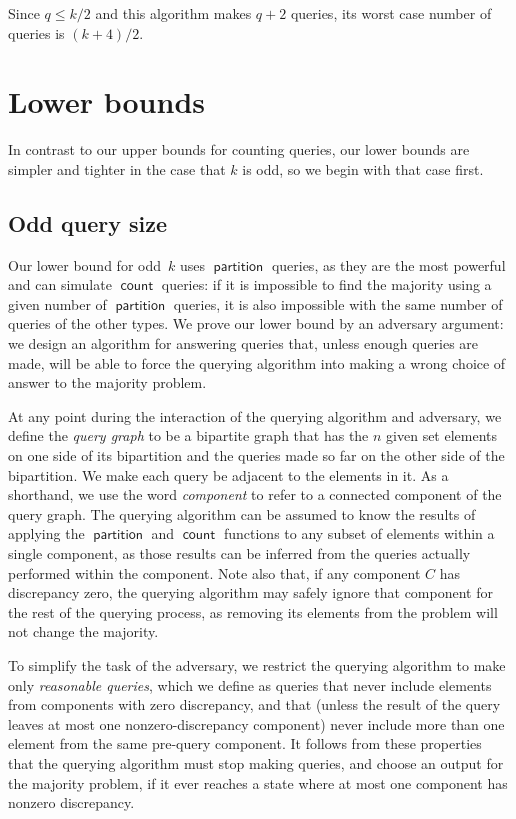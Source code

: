 \documentclass[11pt]{llncs}
\newcommand{\qcount}{\operatorname{\mathsf{count}}}
\newcommand{\qpart}{\operatorname{\mathsf{partition}}}
\begin{document}
Since $q\le k/2$ and this algorithm makes $q+2$ queries, its worst case number of queries
is $(k+4)/2$.
\fi

\section{Lower bounds}

In contrast to our upper bounds for counting queries, our lower bounds are simpler and tighter in the case that $k$ is odd, so we begin with that case first.

\ifFull
\subsection{Odd query size}
\fi

Our lower bound for odd~$k$ uses $\qpart$ queries, as they are the most powerful and can simulate  $\qcount$ queries: if it is impossible to find the majority using a given number of $\qpart$ queries, it is also impossible with the same number of queries of the other types. We prove our lower bound by an adversary argument: we design an algorithm for answering queries that, unless enough queries are made, will be able to force the querying algorithm into making a wrong choice of answer to the majority problem.

At any point during the interaction of the querying algorithm and adversary, we define the \emph{query graph} to be a bipartite graph that has the $n$ given set elements on one side of its bipartition and the queries made so far on the other side of the bipartition. We make each query be adjacent to the elements in it. As a shorthand, we use the word \emph{component} to refer to a connected component of the query graph. The querying algorithm can be assumed to know the results of applying the $\qpart$ and $\qcount$ functions to any subset of elements within a single component, as those results can be inferred from the queries actually performed within the component. Note also that, if any component $C$ has discrepancy zero, the querying algorithm may safely ignore that component for the rest of the querying process, as removing its elements from the problem will not change the majority.

To simplify the task of the adversary, we restrict the querying algorithm to make only \emph{reasonable queries}, which we define as queries that never include elements from components with zero discrepancy, and that (unless the result of the query leaves at most one nonzero-discrepancy component) never include more than one element from the same pre-query component. It follows from these properties that the querying algorithm must stop making queries, and choose an output for the majority problem, if it ever reaches a state where at most one component has nonzero discrepancy.
\end{document}
